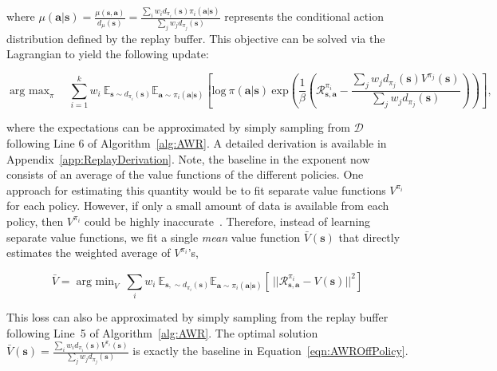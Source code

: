 where $\mu({\mathbf{a}}|{\mathbf{s}}) = \frac{\mu({\mathbf{s}}, {\mathbf{a}})}{d_\mu({\mathbf{s}})} = \frac{\sum_i w_i d_{\pi_i}({\mathbf{s}}) \pi_i({\mathbf{a}}|{\mathbf{s}})}{\sum_j w_j d_{\pi_j}({\mathbf{s}})}$ represents the conditional action distribution defined by the replay buffer. This objective can be solved via the Lagrangian to yield the following update:

\begin{equation}
    \mathop{\mathrm{arg \ max}}_{\pi} \quad \sum_{i=1}^k w_i \ \mathbb{E}_{{\mathbf{s}} \sim d_{\pi_i}({\mathbf{s}})} \mathbb{E}_{{\mathbf{a}} \sim \pi_i({\mathbf{a}} | {\mathbf{s}})} \left[ \mathrm{log} \ \pi ({\mathbf{a}} | {\mathbf{s}}) \ \mathrm{exp}\left(\frac{1}{\beta} \left(\mathcal{R}_{{\mathbf{s}},{\mathbf{a}}}^{\pi_i} - \frac{\sum_j w_j d_{\pi_j}({\mathbf{s}}) V^{\pi_j}({\mathbf{s}})}{\sum_j w_j d_{\pi_j}({\mathbf{s}})} \right) \right) \right] ,

    \label{eqn:AWROffPolicy}
\end{equation}

where the expectations can be approximated by simply sampling from $\mathcal{D}$ following Line 6 of Algorithm~\ref{alg:AWR}. A detailed derivation is available in Appendix~\ref{app:ReplayDerivation}. Note, the baseline in the exponent now consists of an average of the value functions of the different policies. One approach for estimating this quantity would be to fit separate value functions $V^{\pi_i}$ for each policy. However, if only a small amount of data is available from each policy, then $V^{\pi_i}$ could be highly inaccurate~\citep{fu19diagnosing}. Therefore, instead of learning separate value functions, we fit a single \emph{mean} value function $\bar{V}({\mathbf{s}})$ that directly estimates the weighted average of $V^{\pi_i}$'s,

\begin{equation}
\bar{V} = \mathop{\mathrm{arg \ min}}_{V} \  \sum_i w_i \ \mathbb{E}_{{\mathbf{s}}, \sim d_{\pi_i}({\mathbf{s}})} \mathbb{E}_{{\mathbf{a}} \sim \pi_i({\mathbf{a}} | {\mathbf{s}})} \left[ \ ||\mathcal{R}_{{\mathbf{s}}, {\mathbf{a}}}^{\pi_i} - V({\mathbf{s}}) ||^2 \right]
\end{equation}

This loss can also be approximated by simply sampling from the replay buffer following Line~5 of Algorithm~\ref{alg:AWR}. The optimal solution $\bar{V}({\mathbf{s}}) = \frac{\sum_{i} w_i d_{\pi_i}({\mathbf{s}}) V^{\pi_i}({\mathbf{s}})}{\sum_j w_j d_{\pi_j}({\mathbf{s}})}$ is exactly the baseline in Equation~\ref{eqn:AWROffPolicy}.

